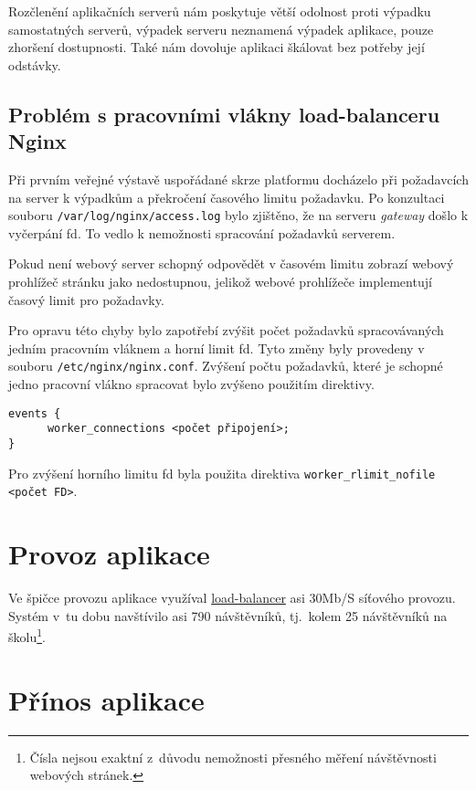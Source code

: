 Rozčlenění aplikačních serverů nám poskytuje větší odolnost proti výpadku samostatných serverů, výpadek serveru neznamená výpadek aplikace, pouze zhoršení dostupnosti.
Také nám dovoluje aplikaci škálovat bez potřeby její odstávky.

\subsection{Problém s pracovními vlákny load-balanceru Nginx}

Při prvním veřejné výstavě uspořádané skrze platformu \bso{} docházelo při požadavcích na server k výpadkům a překročení časového limitu požadavku.
Po konzultaci souboru \verb|/var/log/nginx/access.log| bylo zjištěno, že na serveru \textit{gateway} došlo k vyčerpání \acrshort{fd}.
To vedlo k nemožnosti spracování požadavků serverem.

Pokud není webový server schopný odpovědět v časovém limitu zobrazí webový prohlížeč stránku jako nedostupnou,
jelikož webové prohlížeče implementují časový limit pro požadavky\cite{browser-timeout}.

Pro opravu této chyby bylo zapotřebí zvýšit počet požadavků spracovávaných jedním pracovním vláknem a horní limit \acrshort{fd}.
Tyto změny byly provedeny v souboru \verb|/etc/nginx/nginx.conf|.
Zvýšení počtu požadavků, které je schopné jedno pracovní vlákno spracovat bylo zvýšeno použitím direktivy.
\begin{verbatim}
events {
      worker_connections <počet připojení>;
}
\end{verbatim}
Pro zvýšení horního limitu \acrshort{fd} byla použita direktiva \verb|worker_rlimit_nofile <počet FD>|.

\section{Provoz aplikace}

Ve špičce provozu aplikace \bso{} využíval \hyperref[sub:load-balancing]{load-balancer} asi 30\si{Mb/S} síťového provozu.
Systém v~tu dobu navštívilo asi 790 návštěvníků, tj.\ kolem 25 návštěvníků na školu\footnote{Čísla nejsou exaktní z~důvodu nemožnosti přesného měření návštěvnosti webových stránek.}.


\section{Přínos aplikace}


